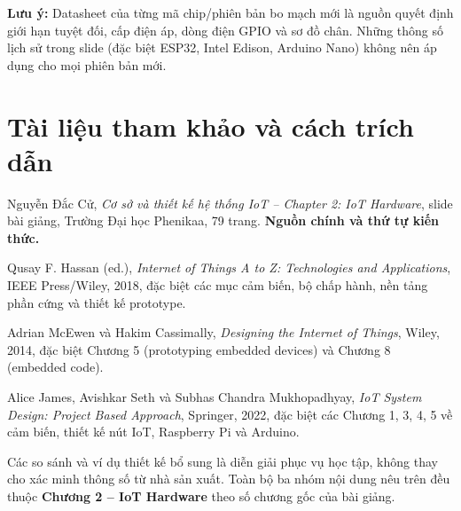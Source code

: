 \documentclass[11pt,a4paper,oneside]{book}
\begin{document}
\begin{notebox}
\textbf{Lưu ý:} Datasheet của từng mã chip/phiên bản bo mạch mới là nguồn quyết định giới hạn tuyệt đối, cấp điện áp, dòng điện GPIO và sơ đồ chân. Những thông số lịch sử trong slide (đặc biệt ESP32, Intel Edison, Arduino Nano) không nên áp dụng cho mọi phiên bản mới.
\end{notebox}
\tableofcontents
\mainmatter
\setcounter{chapter}{1}

\backmatter
\chapter*{Tài liệu tham khảo và cách trích dẫn}
\begin{enumerate}[label={[\arabic*]},leftmargin=*]
\item Nguyễn Đắc Cử, \emph{Cơ sở và thiết kế hệ thống IoT -- Chapter 2: IoT Hardware}, slide bài giảng, Trường Đại học Phenikaa, 79 trang. \textbf{Nguồn chính và thứ tự kiến thức.}
\item Qusay F. Hassan (ed.), \emph{Internet of Things A to Z: Technologies and Applications}, IEEE Press/Wiley, 2018, đặc biệt các mục cảm biến, bộ chấp hành, nền tảng phần cứng và thiết kế prototype.
\item Adrian McEwen và Hakim Cassimally, \emph{Designing the Internet of Things}, Wiley, 2014, đặc biệt Chương 5 (prototyping embedded devices) và Chương 8 (embedded code).
\item Alice James, Avishkar Seth và Subhas Chandra Mukhopadhyay, \emph{IoT System Design: Project Based Approach}, Springer, 2022, đặc biệt các Chương 1, 3, 4, 5 về cảm biến, thiết kế nút IoT, Raspberry Pi và Arduino.
\end{enumerate}
Các so sánh và ví dụ thiết kế bổ sung là diễn giải phục vụ học tập, không thay cho xác minh thông số từ nhà sản xuất. Toàn bộ ba nhóm nội dung nêu trên đều thuộc \textbf{Chương 2 -- IoT Hardware} theo số chương gốc của bài giảng.
\end{document}
